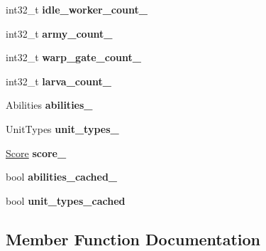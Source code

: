 \begin{DoxyCompactItemize}
int32\+\_\+t {\bfseries idle\+\_\+worker\+\_\+count\+\_\+}
\item 
\mbox{\label{classsc2_1_1_observation_imp_a35fe4919cef0782f4ca4fe4e38f00f91}} 
int32\+\_\+t {\bfseries army\+\_\+count\+\_\+}
\item 
\mbox{\label{classsc2_1_1_observation_imp_ab3c6fc205ca676db56612268e88fc164}} 
int32\+\_\+t {\bfseries warp\+\_\+gate\+\_\+count\+\_\+}
\item 
\mbox{\label{classsc2_1_1_observation_imp_ae04f15a732821f78a1cd7ff3ef8a2d30}} 
int32\+\_\+t {\bfseries larva\+\_\+count\+\_\+}
\item 
\mbox{\label{classsc2_1_1_observation_imp_a3d57c045ce99c51aba8d07a1356f7bad}} 
Abilities {\bfseries abilities\+\_\+}
\item 
\mbox{\label{classsc2_1_1_observation_imp_ad8e87c71a5198f7377abf1a44a71d19e}} 
Unit\+Types {\bfseries unit\+\_\+types\+\_\+}
\item 
\mbox{\label{classsc2_1_1_observation_imp_a3c6fbf535b3faa1e493eb1657260a14c}} 
\hyperlink{structsc2_1_1_score}{Score} {\bfseries score\+\_\+}
\item 
\mbox{\label{classsc2_1_1_observation_imp_a8ec3b27fd52c60b8f1424b01abaa3648}} 
bool {\bfseries abilities\+\_\+cached\+\_\+}
\item 
\mbox{\label{classsc2_1_1_observation_imp_a4dd852af121f946d7e3ad1ba611fe816}} 
bool {\bfseries unit\+\_\+types\+\_\+cached}
\end{DoxyCompactItemize}


\subsection{Member Function Documentation}
\mbox{\label{classsc2_1_1_observation_imp_a97f6013fc1578cc1db1266d39edab7c4}} 
